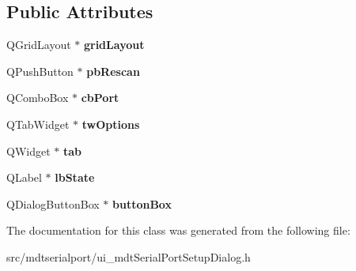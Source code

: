 \subsection*{Public Attributes}
\begin{DoxyCompactItemize}
\item 
\hypertarget{class_ui__mdt_serial_port_setup_dialog_a13a11e9f9ccf2a2b55dcb9b90fb4db94}{
QGridLayout $\ast$ {\bfseries gridLayout}}
\label{class_ui__mdt_serial_port_setup_dialog_a13a11e9f9ccf2a2b55dcb9b90fb4db94}

\item 
\hypertarget{class_ui__mdt_serial_port_setup_dialog_a00ab731bc8c63f64ef981783f3434c17}{
QPushButton $\ast$ {\bfseries pbRescan}}
\label{class_ui__mdt_serial_port_setup_dialog_a00ab731bc8c63f64ef981783f3434c17}

\item 
\hypertarget{class_ui__mdt_serial_port_setup_dialog_afbf0c0bf5fe40ba41986a4548dd32ad1}{
QComboBox $\ast$ {\bfseries cbPort}}
\label{class_ui__mdt_serial_port_setup_dialog_afbf0c0bf5fe40ba41986a4548dd32ad1}

\item 
\hypertarget{class_ui__mdt_serial_port_setup_dialog_a679def9ad26fd3b5d14ce47c0445dae9}{
QTabWidget $\ast$ {\bfseries twOptions}}
\label{class_ui__mdt_serial_port_setup_dialog_a679def9ad26fd3b5d14ce47c0445dae9}

\item 
\hypertarget{class_ui__mdt_serial_port_setup_dialog_a2fba2d05e85b4d015d317703637d387f}{
QWidget $\ast$ {\bfseries tab}}
\label{class_ui__mdt_serial_port_setup_dialog_a2fba2d05e85b4d015d317703637d387f}

\item 
\hypertarget{class_ui__mdt_serial_port_setup_dialog_a8b460fe6e70b33cc1d5a988732bc918c}{
QLabel $\ast$ {\bfseries lbState}}
\label{class_ui__mdt_serial_port_setup_dialog_a8b460fe6e70b33cc1d5a988732bc918c}

\item 
\hypertarget{class_ui__mdt_serial_port_setup_dialog_ad838e2dd8bbfeb9c9dc084d1f7d3e023}{
QDialogButtonBox $\ast$ {\bfseries buttonBox}}
\label{class_ui__mdt_serial_port_setup_dialog_ad838e2dd8bbfeb9c9dc084d1f7d3e023}

\end{DoxyCompactItemize}


The documentation for this class was generated from the following file:\begin{DoxyCompactItemize}
\item 
src/mdtserialport/ui\_\-mdtSerialPortSetupDialog.h\end{DoxyCompactItemize}
